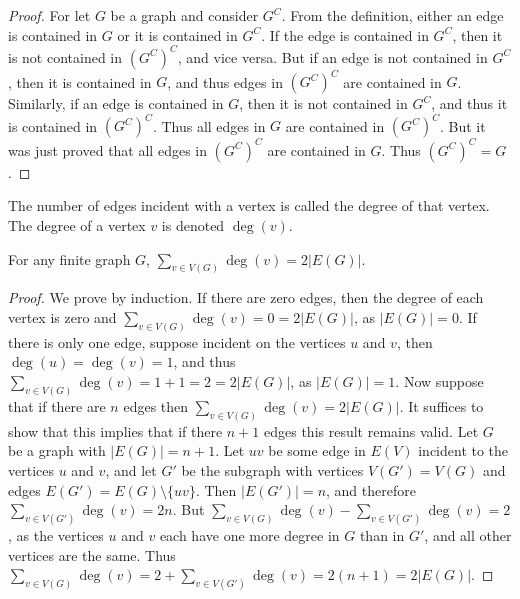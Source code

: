         \begin{proof}
            For let $G$ be a graph and consider $G^C$. From the definition,
            either an edge is contained in $G$ or it is contained in $G^C$. If
            the edge is contained in $G^C$, then it is not contained in
            $(G^C)^C$, and vice versa. But if an edge is not contained in $G^C$,
            then it is contained in $G$, and thus edges in $(G^C)^C$ are
            contained in $G$. Similarly, if an edge is contained in $G$, then it
            is not contained in $G^C$, and thus it is contained in $(G^C)^C$.
            Thus all edges in $G$ are contained in $(G^C)^C$. But it was just
            proved that all edges in $(G^C)^{C}$ are contained in $G$. Thus
            $(G^C)^{C}=G$.
        \end{proof}
        \begin{definition}
            The number of edges incident with a vertex is called the degree of
            that vertex. The degree of a vertex $v$ is denoted $\deg(v)$.
        \end{definition}
        \begin{theorem}
            For any finite graph $G$, $\sum_{v\in{V}(G)}\deg(v)=2|E(G)|$.
        \end{theorem}
        \begin{proof}
            We prove by induction. If there are zero edges, then the degree of
            each vertex is zero and $\sum_{v\in{V}(G)}\deg(v)=0=2|E(G)|$, as
            $|E(G)|=0$. If there is only one edge, suppose incident on the
            vertices $u$ and $v$, then $\deg(u)=\deg(v)=1$, and thus
            $\sum_{v\in{V}(G)}\deg(v)=1+1=2=2|E(G)|$, as $|E(G)|=1$. Now suppose
            that if there are $n$ edges then $\sum_{v\in{V}(G)}\deg(v)=2|E(G)|$.
            It suffices to show that this implies that if there $n+1$ edges this
            result remains valid. Let $G$ be a graph with $|E(G)|=n+1$. Let $uv$
            be some edge in $E(V)$ incident to the vertices $u$ and $v$, and let
            $G'$ be the subgraph with vertices $V(G')=V(G)$ and edges
            $E(G')=E(G)\setminus\{uv\}$. Then $|E(G')|=n$, and therefore
            $\sum_{v\in{V}(G')}\deg(v)=2n$. But
            $\sum_{v\in V(G)}\deg(v)-\sum_{v\in V(G')}\deg(v)=2$, as the
            vertices $u$ and $v$ each have one more degree in $G$ than in $G'$,
            and all other vertices are the same. Thus
            $\sum_{v\in V(G)}\deg(v)=2+\sum_{v\in V(G')}\deg(v)=2(n+1)=2|E(G)|$.
        \end{proof}
